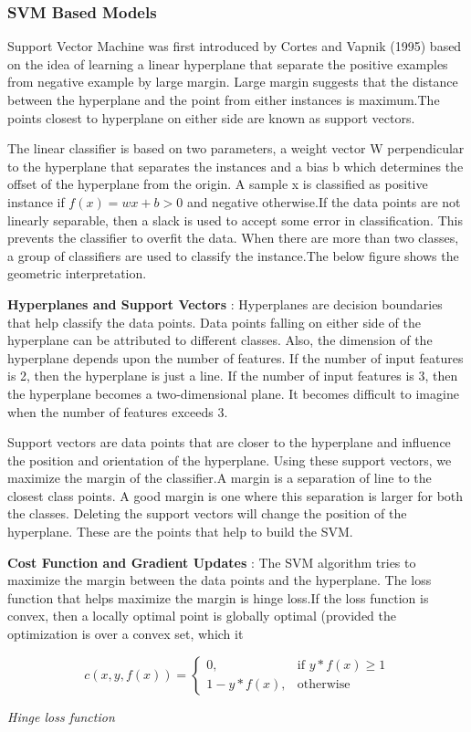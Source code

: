 \documentclass[12pt,a4paper,final]{extreport}
\begin{document}
 \subsubsection{SVM Based Models}
 Support Vector Machine was first introduced by Cortes and Vapnik (1995) based on the idea of learning a linear hyperplane that separate the positive examples from negative example by large margin. Large
 margin suggests that the distance between the hyperplane and the point from either instances is maximum.The points closest to hyperplane on either side are known as support vectors.
 
 \vspace{0.5cm}
 The linear classifier is based on two parameters, a weight
 vector W perpendicular to the hyperplane that separates the instances and a bias b which determines the offset of the hyperplane from the origin. A sample x is classified as positive instance if $f(x)= wx +b > 0 $ and negative otherwise.If the data points are not linearly separable, then a slack is used to accept some error in classification. This prevents the classifier to overfit the data. When there are more than two classes, a group of classifiers are used to classify the instance.The below figure shows the geometric interpretation.


\textbf{Hyperplanes and Support Vectors} :
Hyperplanes are decision boundaries that help classify the data points. Data points falling on either side of the hyperplane can be attributed to different classes. Also, the dimension of the hyperplane depends upon the number of features. If the number of input features is 2, then the hyperplane is just a line. If the number of input features is 3, then the hyperplane becomes a two-dimensional plane. It becomes difficult to imagine when the number of features exceeds 3.


Support vectors are data points that are closer to the hyperplane and influence the position and orientation of the hyperplane. Using these support vectors, we maximize the margin of the classifier.A margin is a separation of line to the closest class points. A good margin is one where this separation is larger for both the classes. Deleting the support vectors will change the position of the hyperplane. These are the points that help to build the SVM.



\textbf{Cost Function and Gradient Updates} :
The SVM algorithm tries to maximize the margin between the data points and the hyperplane. The loss function that helps maximize the margin is hinge loss.If the loss function is convex, then a locally optimal point is globally optimal (provided the optimization is over a convex set, which it 
\begin{mycapequ}[!ht]
\[ 
c(x,y,f(x)) = \begin{cases}
0,& \text{if } y*f(x)\geq 1\\
1-y*f(x),              & \text{otherwise}
\end{cases} \]
\caption{\textit{Hinge loss function}}
\end{mycapequ}
\end{document}
